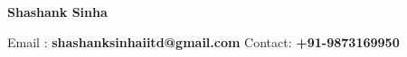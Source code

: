 \begin{center}
\Large \textbf{Shashank Sinha}\\
\end{center}\normalsize 
Email : \textbf{shashanksinhaiitd@gmail.com} \hfill Contact: \textbf{+91-9873169950}
